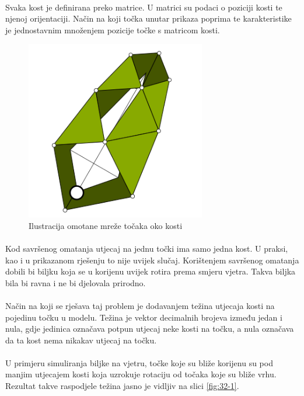 \documentclass[times, utf8, diplomski]{fer}
\begin{document}
\paragraph{}
Svaka kost je definirana preko matrice. U matrici su podaci o poziciji kosti te njenoj 
orijentaciji. Način na koji točka unutar prikaza poprima te karakteristike je jednostavnim 
množenjem pozicije točke s matricom kosti.

\begin{figure}[h]
	\centering
	\includegraphics[width=0.7\textwidth]{img/41-1}
	\caption{Ilustracija omotane mreže točaka oko kosti}
	\label{fig:41-1}
\end{figure}

\paragraph{}
Kod savršenog omatanja utjecaj na jednu točki ima samo jedna kost. U praksi, kao i u 
prikazanom rješenju to nije uvijek slučaj. Korištenjem savršenog omatanja dobili bi biljku 
koja se u korijenu uvijek rotira prema smjeru vjetra. Takva biljka bila bi ravna i ne bi 
djelovala prirodno. 

\paragraph{}
Način na koji se rješava taj problem je dodavanjem težina utjecaja kosti na pojedinu točku u 
modelu. Težina je vektor decimalnih brojeva između jedan i nula, gdje jedinica označava 
potpun utjecaj neke kosti na točku, a nula označava da ta kost nema nikakav utjecaj na 
točku.

\paragraph{}
U primjeru simuliranja biljke na vjetru, točke koje su bliže korijenu su pod manjim 
utjecajem kosti koja uzrokuje rotaciju od točaka koje su bliže vrhu. Rezultat takve 
raspodjele težina jasno je vidljiv na slici \ref{fig:32-1}.
\end{document}
